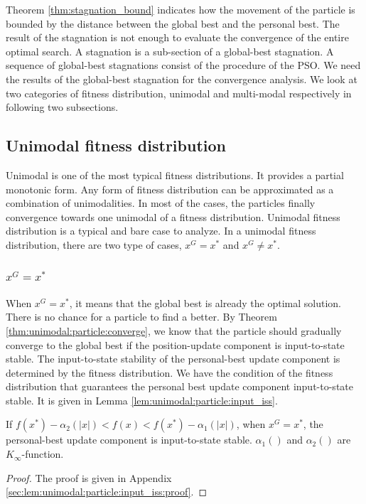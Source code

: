 Theorem \ref{thm:stagnation_bound} indicates how the movement of the particle is bounded by the distance between the global best and the personal best.
The result of the stagnation is not enough to evaluate the convergence of the entire optimal search.
A stagnation is a sub-section of a global-best stagnation.
A sequence of global-best stagnations consist of the procedure of the PSO.
We need the results of the global-best stagnation for the convergence analysis.
We look at two categories of fitness distribution, unimodal and multi-modal respectively in following two subsections.

\subsection{Unimodal fitness distribution}

Unimodal is one of the most typical fitness distributions.
It provides a partial monotonic form.
Any form of fitness distribution can be approximated as a combination of unimodalities.
In most of the cases, the particles finally convergence towards one unimodal of a fitness distribution.
Unimodal fitness distribution is a typical and bare case to analyze.
In a unimodal fitness distribution, there are two type of cases, $ x^{G} = x^{*} $ and $ x^{G} \neq x^{*} $.

\subsubsection{$ x^{G} = x^{*} $}

When $ x^{G} = x^{*} $, it means that the global best is already the optimal solution.
There is no chance for a particle to find a better.
By Theorem \ref{thm:unimodal:particle:converge}, we know that the particle should gradually converge to the global best if the position-update component is input-to-state stable.
The input-to-state stability of the personal-best update component is determined by the fitness distribution.
We have the condition of the fitness distribution that guarantees the personal best update component input-to-state stable.
It is given in Lemma \ref{lem:unimodal:particle:input_iss}.

\begin{mylem}
\label{lem:unimodal:particle:input_iss}
If $ f(x^{*}) - \alpha_{2} ( |x| ) <  f(x) < f(x^{*}) - \alpha_{1} ( |x| ) $, when $ x^{G} = x^{*} $, the personal-best update component is input-to-state stable.
$ \alpha_{1} () $ and $ \alpha_{2} () $ are $ K_{\infty} $-function.
\begin{proof}
The proof is given in Appendix \ref{sec:lem:unimodal:particle:input_iss:proof}.
\end{proof}
\end{mylem}

